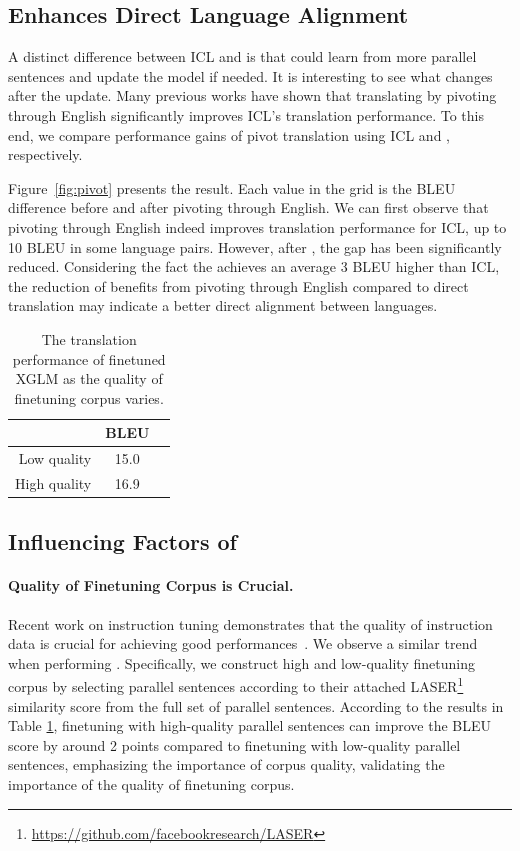 \subsection{\method Enhances Direct Language Alignment} 
A distinct difference between ICL and \method is that \method could learn from more parallel sentences and update the model if needed. It is interesting to see what changes after the update. Many previous works \citep{zhang2023prompting,jiao2023chatgpt} have shown that translating by pivoting through English significantly improves ICL's translation performance. To this end, we compare performance gains of pivot translation using ICL and \methodend, respectively. 

Figure~\ref{fig:pivot} presents the result. Each value in the grid is the BLEU difference before and after pivoting through English. We can first observe that pivoting through English indeed improves translation performance for ICL, up to 10 BLEU in some language pairs. However, after \methodend, the gap has been significantly reduced. Considering the fact the \method achieves an average 3 BLEU higher than ICL, the reduction of benefits from pivoting through English compared to direct translation may indicate a better direct alignment between languages.



\begin{table}[t]
\centering
\begin{tabular}{rcc}
\toprule
\multicolumn{1}{l}{}  & \textbf{BLEU}  \\ \midrule
Low quality      & 15.0         \\
High quality & 16.9       \\ \bottomrule
\end{tabular}
\caption{The translation performance of finetuned XGLM as the quality of finetuning corpus varies.}
\label{tab:low}
\end{table}

\subsection{Influencing Factors of \method}
\paragraph{Quality of Finetuning Corpus is Crucial.}

Recent work on instruction tuning demonstrates that the quality of instruction data is crucial for achieving good performances~\citep{zhou2023lima}. We observe a similar trend when performing \methodend. Specifically, we construct high and low-quality finetuning corpus by selecting parallel sentences according to their attached LASER\footnote{\url{https://github.com/facebookresearch/LASER}} similarity score from the full set of parallel sentences. According to the results in Table \ref{tab:low}, finetuning with high-quality parallel sentences can improve the BLEU score by around 2 points compared to finetuning with low-quality parallel sentences, emphasizing the importance of corpus quality, validating the importance of the quality of finetuning corpus.




